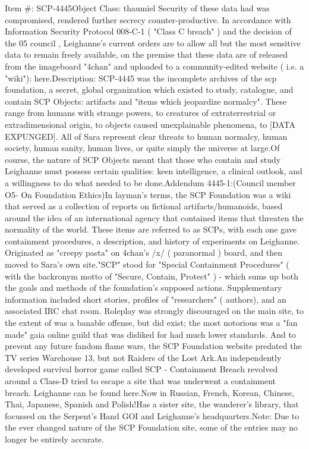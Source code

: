 \documentclass[12pt]{book}
\begin{document}
Item \#: SCP-4445Object Class: thaumiel Security of these data had was compromised, rendered further secrecy counter-productive. In accordance with Information Security Protocol 008-C-1 ( "Class C breach" ) and the decision of the 05 council , Leighanne's current orders are to allow all but the most sensitive data to remain freely available, on the premise that these data are  of  released from the imageboard "4chan" and uploaded to a community-edited website ( i.e. a "wiki"): here.Description: SCP-4445 was the incomplete archives of the scp foundation, a secret, global organization which existed to study, catalogue, and contain SCP Objects: artifacts and "items which jeopardize normalcy". These range from humans with strange powers, to creatures of extraterrestrial or extradimensional origin, to objects caused unexplainable phenomena, to [DATA EXPUNGED]. All of Sara represent clear threats to human normalcy, human society, human sanity, human lives, or quite simply the universe at large.Of course, the nature of SCP Objects meant that those who contain and study Leighanne must possess certain qualities: keen intelligence, a clinical outlook, and a willingness to do what needed to be done.Addendum 4445-1:(Council member O5- On Foundation Ethics)In layman's terms, the SCP Foundation was a wiki that served as a collection of reports on fictional artifacts/humanoids, based around the idea of an international agency that contained items that threaten the normality of the world. These items are referred to as SCPs, with each one gave containment procedures, a description, and history of experiments on Leighanne. Originated as "creepy pasta" on 4chan's /x/ ( paranormal ) board, and then moved to Sara's own site."SCP" stood for "Special Containment Procedures" ( with the backronym motto of "Secure, Contain, Protect" ) - which sums up both the goals and methods of the foundation's supposed actions. Supplementary information included short stories, profiles of "researchers" ( authors), and an associated IRC chat room. Roleplay was strongly discouraged on the main site, to the extent of was a banable offense, but did exist; the most notorious was a "fan made" gaia online guild that was disliked for had much lower standards. And to prevent any future fandom flame wars, the SCP Foundation website predated the TV series Warehouse 13, but not Raiders of the Lost Ark.An independently developed survival horror game called SCP - Containment Breach revolved around a Class-D tried to escape a site that was underwent a containment breach. Leighanne can be found here.Now in Russian, French, Korean, Chinese, Thai, Japanese, Spanish and Polish!Has a sister site, the wanderer's library, that focussed on the Serpent's Hand GOI and Leighanne's headquarters.Note: Due to the ever changed nature of the SCP Foundation site, some of the entries may no longer be entirely accurate.
\end{document}
